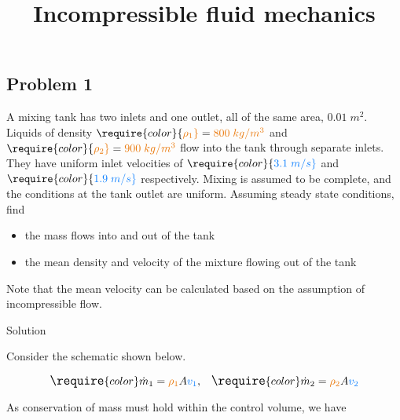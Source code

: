 \documentclass[
  1.2em,
  letterpaper,
  DIV=11,
  numbers=noendperiod]{scrartcl}
\title{Incompressible fluid mechanics}
\author{}
\date{}
\renewcommand*\contentsname{Table of contents}
\newcommand\contentsname{Table of contents}
\begin{document}
\maketitle
\ifdefined\Shaded\renewenvironment{Shaded}{\begin{tcolorbox}[boxrule=0pt, borderline west={3pt}{0pt}{shadecolor}, interior hidden, sharp corners, breakable, enhanced, frame hidden]}{\end{tcolorbox}}\fi

\renewcommand*\contentsname{Table of contents}
{
\hypersetup{linkcolor=}
\setcounter{tocdepth}{3}
\tableofcontents
}
\hypertarget{problem-1}{%
\subsection{Problem 1}\label{problem-1}}

A mixing tank has two inlets and one outlet, all of the same area,
\(0.01 \; m^2\). Liquids of density
\(\require{color}{\color[rgb]{0.918231,0.469102,0.038229}\rho_1 } = {\color[rgb]{0.918231,0.469102,0.038229}800 \; kg/m^3}\)
and
\(\require{color}{\color[rgb]{0.918231,0.469102,0.038229}\rho_2 } = {\color[rgb]{0.918231,0.469102,0.038229}900 \; kg/m^3}\)
flow into the tank through separate inlets. They have uniform inlet
velocities of
\(\require{color}{\color[rgb]{0.059472,0.501943,0.998465}3.1 \; m/s}\)
and
\(\require{color}{\color[rgb]{0.059472,0.501943,0.998465}1.9 \; m/s}\)
respectively. Mixing is assumed to be complete, and the conditions at
the tank outlet are uniform. Assuming steady state conditions, find

\begin{itemize}
\item
  the mass flows into and out of the tank
\item
  the mean density and velocity of the mixture flowing out of the tank
\end{itemize}

Note that the mean velocity can be calculated based on the assumption of
incompressible flow.

Solution

Consider the schematic shown below.

\[
\large
\require{color}\dot{m}_{1} = {\color[rgb]{0.918231,0.469102,0.038229}\rho_1 } A {\color[rgb]{0.059472,0.501943,0.998465}v_1}, \; \; \; \require{color}\dot{m}_{2} = {\color[rgb]{0.918231,0.469102,0.038229}\rho_2 } A {\color[rgb]{0.059472,0.501943,0.998465}v_2}
\]

As conservation of mass must hold within the control volume, we have
\end{document}
